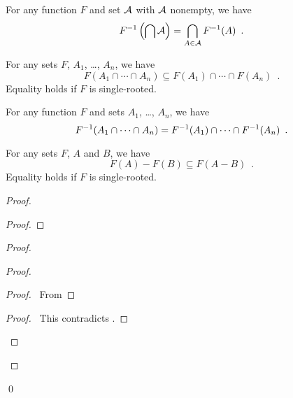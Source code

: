 \begin{corollary}
    For any function $F$ and set $\AA$ with $\AA$ nonempty, we have
    \[ \inv{F} \left( \bigcap \AA \right) = \bigcap_{A \in \AA} \inv{F}(A) \enspace . \]
\end{corollary}

\begin{corollary}
    For any sets $F$, $A_1$, \ldots, $A_n$, we have
    \[ F(A_1 \cap \cdots \cap A_n) \subseteq F(A_1) \cap \cdots \cap F(A_n) \enspace . \]
    Equality holds if $F$ is single-rooted.
\end{corollary}

\begin{corollary}
    For any function $F$ and sets $A_1$, \ldots, $A_n$, we have
    \[ \inv{F}(A_1 \cap \cdots \cap A_n) = \inv{F}(A_1) \cap \cdots \cap \inv{F}(A_n) \enspace . \]
\end{corollary}

\begin{theorem}
    For any sets $F$, $A$ and $B$, we have
    \[ F(A) - F(B) \subseteq F(A - B) \enspace . \]
    Equality holds if $F$ is single-rooted.
\end{theorem}

\begin{proof}
    \pf
    \begin{proof}
    \end{proof}
    \begin{proof}
        \begin{proof}
            \begin{proof}
                \pf\ From 
            \end{proof}
            \qedstep
            \begin{proof}
                \pf\ This contradicts .
            \end{proof}
        \end{proof}
    \end{proof}
    \qed
\end{proof}

